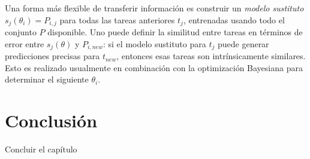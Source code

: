 \quad

Una forma más flexible de transferir información es construir un \textit{modelo sustituto} $s_j(\theta_i) = P_{i,j}$ para todas las tareas anteriores $t_j$, entrenadas usando todo el conjunto $P$ disponible. Uno puede definir la similitud entre tareas en términos de error entre $s_j(\theta)$ y $P_{i, new}$: si el modelo sustituto para $t_j$ puede generar predicciones precisas para $t_{new}$, entonces esas tareas son intrínsicamente similares. Esto es realizado usualmente en combinación con la optimización Bayesiana para determinar el siguiente $\theta_i$. 



\section{Conclusión}\label{sec:conclusion}

Concluir el capítulo


